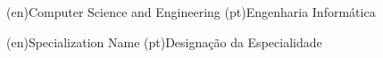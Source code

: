 %
%
%
%
\ntdegreename*(en){Computer Science and Engineering}
\ntdegreename*(pt){Engenharia Informática}



%
%
%
%
\ntspecialization*(en){Specialization Name}         %
\ntspecialization*(pt){Designação da Especialidade} %



%
%
%
%
%
%







